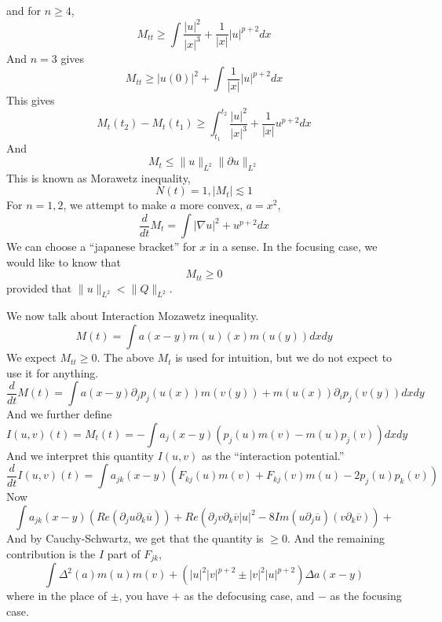 and for $n\geq 4$,
\begin{equation*}
    M_{tt}\geq\int\frac{|u|^2}{|x|^3}+\frac{1}{|x|}|u|^{p+2}dx
\end{equation*}
And $n=3$ gives 
\begin{equation*}
    M_{tt}\geq|u(0)|^2+\int\frac{1}{|x|}|u|^{p+2}dx
\end{equation*}
This gives 
\begin{equation*}
    M_t(t_2)-M_t(t_1)\geq\int_{t_1}^{t_2}\frac{|u|^2}{|x|^3}+\frac{1}{|x|}u^{p+2}dx
\end{equation*}
And 
\begin{equation*}
    M_t\leq \|u\|_{L^2}\|\partial u\|_{L^2}
\end{equation*}
This is known as Morawetz inequality,
\begin{equation*}
    N(t)=1, |M_t|\lesssim 1
\end{equation*}
For $n=1,2$, we attempt to make $a$ more convex, $a=x^2$,
\begin{equation*}
    \frac{d}{dt}M_t=\int|\nabla u|^2+u^{p+2}dx
\end{equation*}
We can choose a ``japanese bracket'' for $x$ in a sense. In the focusing case, we would like to know that 
\begin{equation*}
    M_{tt}\geq 0
\end{equation*}
provided that $\|u\|_{L^2}<\|Q\|_{L^2}$. 

We now talk about Interaction Mozawetz inequality.
\begin{equation*}
    M(t)=\int a(x-y)m(u)(x)m(u(y))dxdy
\end{equation*}
We expect $M_{tt}\geq 0$. The above $M_t$ is used for intuition, but we do not expect to use it for anything.
\begin{equation*}
    \frac{d}{dt}M(t)=\int a(x-y)\partial_j p_j(u(x))m(v(y))+m(u(x))\partial_ip_j(v(y))dxdy
\end{equation*}
And we further define
\begin{equation*}
    I(u,v)(t)=M_t(t)=-\int a_j(x-y)(p_j(u)m(v)-m(u)p_j(v))dxdy
\end{equation*}
And we interpret this quantity $I(u,v)$ as the ``interaction potential.''
\begin{equation*}
    \frac{d}{dt}I(u,v)(t)=\int a_{jk}(x-y)(F_{kj}(u)m(v)+F_{kj}(v)m(u)-2p_j(u)p_k(v))
\end{equation*}
Now 
\begin{equation*}
    \int a_{jk}(x-y)(Re(\partial_j u\partial_k\overline{u}))+Re(\partial_jv\partial_k\overline{v}|u|^2-8Im(u\partial_j\overline{u})(v\partial_k\overline{v}))+
\end{equation*}
And by Cauchy-Schwartz, we get that the quantity is $\geq 0$. And the remaining contribution is the $I$ part of $F_{jk}$, 
\begin{equation*}
    \int\Delta^2(a)m(u)m(v)+(|u|^2|v|^{p+2}\pm|v|^2|u|^{p+2})\Delta a(x-y)
\end{equation*}
where in the place of $\pm$, you have $+$ as the defocusing case, and $-$ as the focusing case.

